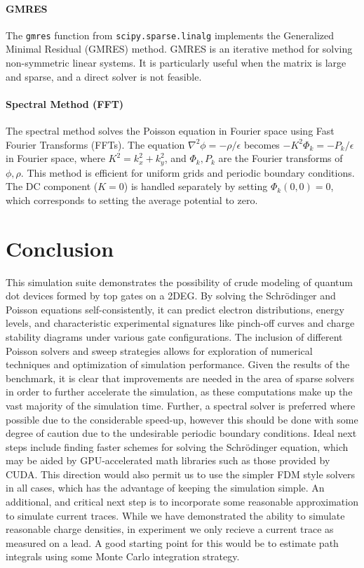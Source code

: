\documentclass{article}
\begin{document}
\paragraph{GMRES}
The \texttt{gmres} function from \texttt{scipy.sparse.linalg} implements the Generalized Minimal Residual (GMRES) method. GMRES is an iterative method for solving non-symmetric linear systems. It is particularly useful when the matrix is large and sparse, and a direct solver is not feasible.

\paragraph{Spectral Method (FFT)}
The spectral method solves the Poisson equation in Fourier space using Fast Fourier Transforms (FFTs). The equation \(\nabla^2 \phi = -\rho/\epsilon\) becomes \(-K^2 \Phi_k = -P_k/\epsilon\) in Fourier space, where \(K^2 = k_x^2 + k_y^2\), and \(\Phi_k, P_k\) are the Fourier transforms of \(\phi, \rho\). This method is efficient for uniform grids and periodic boundary conditions. The DC component (\(K=0\)) is handled separately by setting \(\Phi_k(0,0)=0\), which corresponds to setting the average potential to zero.

\section{Conclusion}
This simulation suite demonstrates the possibility of crude modeling of quantum dot devices formed by top gates on a 2DEG. By solving the Schrödinger and Poisson equations self-consistently, it can predict electron distributions, energy levels, and characteristic experimental signatures like pinch-off curves and charge stability diagrams under various gate configurations. The inclusion of different Poisson solvers and sweep strategies allows for exploration of numerical techniques and optimization of simulation performance. Given the results of the benchmark, it is clear that improvements are needed in the area of sparse solvers in order to further accelerate the simulation, as these computations make up the vast majority of the simulation time. Further, a spectral solver is preferred where possible due to the considerable speed-up, however this should be done with some degree of caution due to the undesirable periodic boundary conditions. Ideal next steps include finding faster schemes for solving the Schrödinger equation, which may be aided by GPU-accelerated math libraries such as those provided by CUDA. This direction would also permit us to use the simpler FDM style solvers in all cases, which has the advantage of keeping the simulation simple. An additional, and critical next step is to incorporate some reasonable approximation to simulate current traces. While we have demonstrated the ability to simulate reasonable charge densities, in experiment we only recieve a current trace as measured on a lead. A good starting point for this would be to estimate path integrals using some Monte Carlo integration strategy.

\newpage
\end{document}

